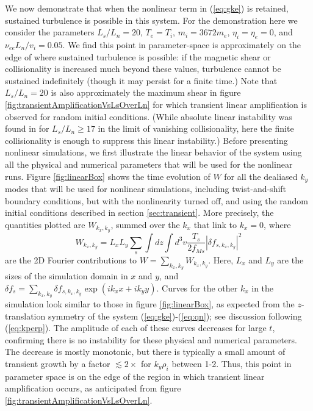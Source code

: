 \documentclass[12pt,superscriptaddress]{revtex4}
\newcommand{\nuee}{\nu_{ee}}
\begin{document}
We now demonstrate that when the nonlinear term in (\ref{eq:gke})
is retained, sustained turbulence is possible
in this system.
For the demonstration here we consider
the parameters $L_s/L_n = 20$, $T_e = T_i$, $m_i = 3672 m_e$, $\eta_i = \eta_e = 0$, and $\nuee L_n / v_i = 0.05$.
We find this point in parameter-space is approximately on the edge of where sustained turbulence
is possible: if the magnetic shear or collisionality is increased much beyond these values,
turbulence cannot be sustained indefinitely (though it may persist for a finite time.)
Note that $L_s/L_n=20$ is also approximately the maximum shear
in figure \ref{fig:transientAmplificationVsLsOverLn} for which transient linear amplification is observed
for random initial conditions.
(While absolute linear instability was found in \cite{usUniversalInstability} for $L_s/L_n \ge 17$ in the limit of vanishing collisionality, here the finite collisionality is enough to suppress this linear instability.)
Before presenting nonlinear simulations,
we first illustrate the linear behavior of the system using all the physical and numerical
parameters that will be used for the nonlinear runs.  Figure \ref{fig:linearBox} shows the time evolution of
$W$ for all the dealiased $k_y$ modes that will be
used for nonlinear simulations, including twist-and-shift boundary conditions,
but with the nonlinearity turned off, and
using the random initial conditions described in section \ref{sec:transient}.
More precisely, the quantities plotted are $W_{k_x,k_y}$, summed over the $k_x$ that link to $k_x=0$, where
\begin{equation}
\label{eq:Wk}
W_{k_x,k_y} = L_x L_y \sum_s \int dz \int d^3v \frac{T_s}{2 f_{Ms}}\left|\delta\! f_{s,k_x,k_y}\right|^2
\end{equation}
are the 2D Fourier contributions to $W = \sum_{k_x,k_y} W_{k_x,k_y}$.
Here,
$L_x$ and $L_y$ are the sizes of the simulation domain in $x$ and $y$,
and $\delta\! f_s =\sum_{k_x,k_y} \delta\! f_{s,k_x,k_y} \exp( i k_x x+i k_y y)$.
Curves for the other $k_x$ in the simulation look similar to those in figure \ref{fig:linearBox},
as expected from the $z$-translation symmetry of the system (\ref{eq:gke})-(\ref{eq:qn}); see discussion following (\ref{eq:kperp}).
The amplitude of each
of these curves decreases for large $t$, confirming there is no instability for these physical and
numerical parameters.  The decrease is mostly monotonic, but there is typically a small
amount of transient growth by a factor $ \lesssim 2\times$ for $k_y \rho_i$ between 1-2.
Thus, this point in parameter space is on the edge of the region in which transient linear
amplification occurs, as anticipated from figure \ref{fig:transientAmplificationVsLsOverLn}.
\end{document}
